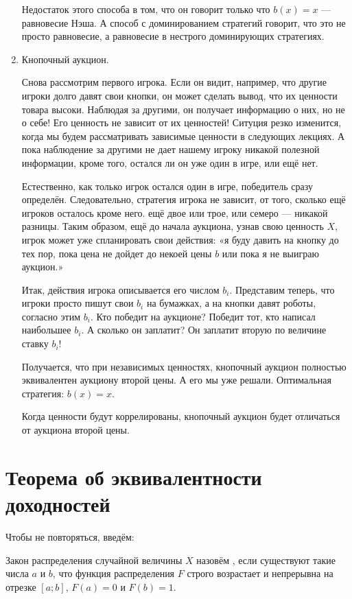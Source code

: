 \begin{enumerate}
\begin{myex}
Недостаток этого способа в том, что он говорит только что $ b(x)=x $ — равновесие Нэша. А способ с доминированием стратегий говорит, что это не просто равновесие, а равновесие в нестрого доминирующих стратегиях.
\end{myex}

\item Кнопочный аукцион.

Снова рассмотрим первого игрока. Если он видит, например, что другие игроки долго давят свои кнопки, он может сделать вывод, что их ценности товара высоки. Наблюдая за другими, он получает информацию о них, но не о себе! Его ценность не зависит от их ценностей! Ситуция резко изменится, когда мы будем рассматривать зависимые ценности в следующих лекциях. А пока наблюдение за другими не дает нашему игроку никакой полезной информации, кроме того, остался ли он уже один в игре, или ещё нет.

Естественно, как только игрок остался один в игре, победитель сразу определён. Следовательно, стратегия игрока не зависит, от того, сколько ещё игроков осталось кроме него. ещё двое или трое, или семеро — никакой разницы. Таким образом, ещё до начала аукциона, узнав свою ценность $ X $, игрок может уже спланировать свои действия: «я буду давить на кнопку до тех пор, пока цена не дойдет до некоей цены $ b $ или пока я не выиграю аукцион.»

Итак, действия игрока описывается его числом $ b_{i} $. Представим теперь, что игроки просто пишут свои $ b_{i} $ на бумажках, а на кнопки давят роботы, согласно этим $ b_{i} $. Кто победит на аукционе? Победит тот, кто написал наибольшее $ b_{i} $. А сколько он заплатит? Он заплатит вторую по величине ставку $ b_{i} $!

Получается, что при независимых ценностях, кнопочный аукцион полностью эквивалентен аукциону второй цены. А его мы уже решали. Оптимальная стратегия: $ b(x)=x $.

Когда ценности будут коррелированы, кнопочный аукцион будет отличаться от аукциона второй цены.

\end{enumerate}


\section{Теорема об эквивалентности доходностей}

Чтобы не повторяться, введём:

\begin{mydef}
Закон распределения случайной величины $ X $ назовём , если существуют такие числа $a$ и $b$, что функция распределения $ F $ строго возрастает и непрерывна на отрезке $ [a;b] $, $ F(a)=0 $ и $ F(b)=1 $.
\end{mydef}


